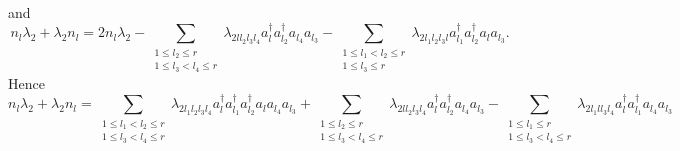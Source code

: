 \documentclass[12pt]{article}
\begin{document}
and 
\begin{equation}
n_{l}\lambda _{2}+\lambda _{2}n_{l}=2n_{l}\lambda _{2}-\sum_{\substack{ %
1\leq l_{2}\leq r \\ 1\leq l_{3}<l_{4}\leq r}}\lambda
_{2ll_{2}l_{3}l_{4}}a_{l}^{\dagger }a_{l_{2}}^{\dagger
}a_{l_{4}}a_{l_{3}}-\sum_{\substack{ 1\leq l_{1}<l_{2}\leq r \\ 1\leq
l_{3}\leq r}}\lambda _{2l_{1}l_{2}l_{3}l}a_{l_{1}}^{\dagger
}a_{l_{2}}^{\dagger }a_{l}a_{l_{3}}.
\end{equation}%
Hence 
\begin{equation}
n_{l}\lambda _{2}+\lambda _{2}n_{l}=\sum_{\substack{ 1\leq l_{1}<l_{2}\leq r
\\ 1\leq l_{3}<l_{4}\leq r}}\lambda _{2l_{1}l_{2}l_{3}l_{4}}a_{l}^{\dagger
}a_{l_{1}}^{\dagger }a_{l_{2}}^{\dagger }a_{l}a_{l_{4}}a_{l_{3}}+\sum
_{\substack{ 1\leq l_{2}\leq r \\ 1\leq l_{3}<l_{4}\leq r}}\lambda
_{2ll_{2}l_{3}l_{4}}a_{l}^{\dagger }a_{l_{2}}^{\dagger
}a_{l_{4}}a_{l_{3}}-\sum_{\substack{ 1\leq l_{1}\leq r \\ 1\leq
l_{3}<l_{4}\leq r}}\lambda _{2l_{1}ll_{3}l_{4}}a_{l}^{\dagger
}a_{l_{1}}^{\dagger }a_{l_{4}}a_{l_{3}}
\end{equation}
\end{document}
